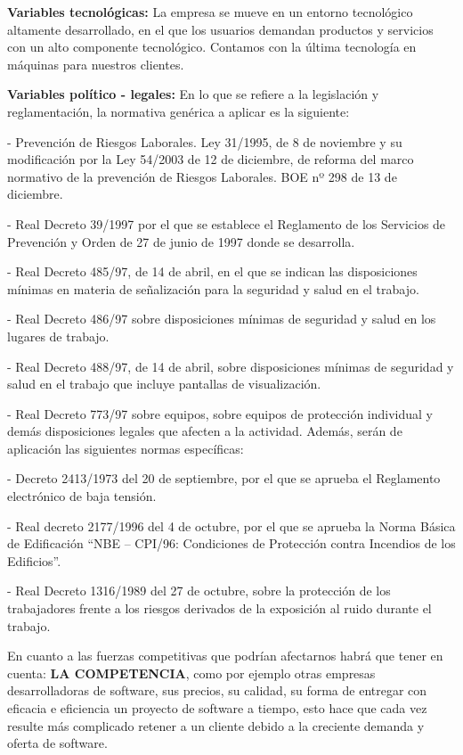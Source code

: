 \documentclass[10pt,a4paper]{article}
\begin{document}
\begin{enumerate}
\textbf{Variables tecnológicas: }La empresa se mueve en un entorno tecnológico altamente desarrollado, en el que los usuarios demandan productos y servicios con un alto componente tecnológico. Contamos con la última tecnología en máquinas para nuestros clientes.

\textbf{Variables político - legales: }En lo que se refiere a la legislación y reglamentación, la normativa genérica a aplicar es la siguiente: 

- Prevención de Riesgos Laborales. Ley 31/1995, de 8 de noviembre y su modificación por la Ley 54/2003 de 12 de diciembre, de reforma del marco normativo de la prevención de Riesgos Laborales. BOE nº 298 de 13 de diciembre.

- Real Decreto 39/1997 por el que se establece el Reglamento de los Servicios de Prevención y Orden de 27 de junio de 1997 donde se desarrolla.

- Real Decreto 485/97, de 14 de abril, en el que se indican las disposiciones mínimas en materia de señalización para la seguridad y salud en el trabajo.

- Real Decreto 486/97 sobre disposiciones mínimas de seguridad y salud en los lugares de trabajo.

- Real Decreto 488/97, de 14 de abril, sobre disposiciones mínimas de seguridad y salud en el trabajo que incluye pantallas de visualización.

- Real Decreto 773/97 sobre equipos, sobre equipos de protección individual y demás disposiciones legales que afecten a la actividad. Además, serán de aplicación las siguientes normas específicas:

- Decreto 2413/1973 del 20 de septiembre, por el que se aprueba el Reglamento electrónico de baja tensión. 

- Real decreto 2177/1996 del 4 de octubre, por el que se aprueba la Norma Básica de Edificación “NBE – CPI/96: Condiciones de Protección contra Incendios de los Edificios”. 

- Real Decreto 1316/1989 del 27 de octubre, sobre la protección de los trabajadores frente a los riesgos derivados de la exposición al ruido durante el trabajo.

En cuanto a las fuerzas competitivas que podrían afectarnos habrá que tener en cuenta: \textbf{LA COMPETENCIA}, como por ejemplo otras empresas desarrolladoras de software, sus precios, su calidad, su forma de entregar con eficacia e eficiencia un proyecto de software a tiempo, esto hace que cada vez resulte más complicado retener a un cliente debido a la creciente demanda y oferta de software.


\end{enumerate}
\end{document}
